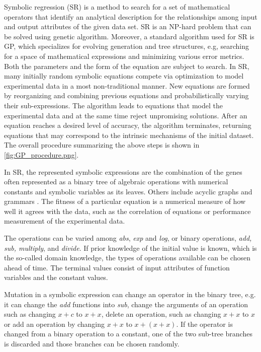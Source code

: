 \documentclass[10pt,journal,compsoc]{IEEEtran}
\begin{document}
Symbolic regression (SR) is a method to search for a set of mathematical operators that identify an analytical description for the relationships among input and output attributes of the given data set. SR is an NP-hard problem that can be solved using genetic algorithm. Moreover, a standard algorithm used for SR is GP, which specializes for evolving generation and tree structures, e.g, searching for a space of mathematical expressions and minimizing various error metrics. Both the parameters and the form of the equation are subject to search. In SR, many initially random symbolic equations compete via optimization to model experimental data in a most non-traditional manner. New equations are formed by reorganizing and combining previous equations and probabilistically varying their sub-expressions. The algorithm leads to equations that model the experimental data and at the same time reject unpromising solutions.  After an equation reaches a desired level of accuracy, the algorithm terminates, returning equations that may correspond to the intrinsic mechanisms of the initial dataset\cite{SchmidtSR}. The overall procedure summarizing the above steps is shown in \autoref{fig:GP_procedure.png}.

In SR, the represented symbolic expressions are the combination of the genes often represented as a binary tree of algebraic operations with numerical constants and symbolic variables as its leaves. Others include acyclic graphs and grammars \cite{Tsoumakas2007}. The fitness of a particular equation is a numerical measure of how well it agrees with the data, such as the correlation of equations or performance measurement of the experimental data.

The operations can be varied among \textit{abs}, \textit{exp} and \textit{log}, or binary operations, \textit{add, sub, multiply}, and \textit{divide}. If prior knowledge of the initial value is known, which is the so-called domain knowledge, the types of operations available can be chosen ahead of time. The terminal values consist of input attributes of function variables and the constant values.

Mutation in a symbolic expression can change an operator in the binary tree, e.g. it can change the \textit{add} functions into \textit{sub}, change the arguments of an operation such as changing $x+c$ to $ x+x$, delete an operation, such as changing $x+x$ to $ x$ or add an operation by changing $x+x$ to $ x+(x+x)$. If the operator is changed from a binary operation to a constant, one of the two sub-tree branches is discarded and those branches can be chosen randomly.
\end{document}
